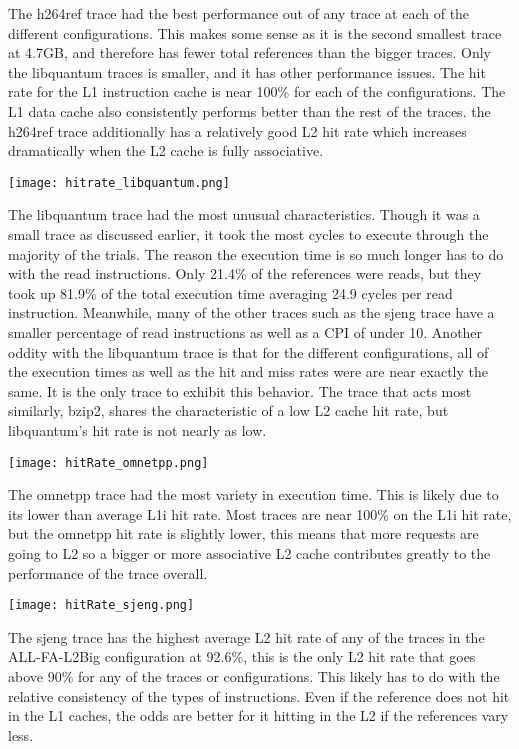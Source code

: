 \documentclass[cacheSimReport.tex]{subfiles}
\begin{document}
The h264ref trace had the best performance out of any trace at each of the different configurations. This makes some sense as it is the second smallest trace at 4.7GB, and therefore has fewer total references than the bigger traces. Only the libquantum traces is smaller, and it has other performance issues. The hit rate for the L1 instruction cache is near 100\% for each of the configurations. The L1 data cache also consistently performs better than the rest of the traces. the h264ref trace additionally has a relatively good L2 hit rate which increases dramatically when the L2 cache is fully associative.

\hspace{-.9cm}\texttt{[image: hitrate\_libquantum.png]}

The libquantum trace had the most unusual characteristics. Though it was a small trace as discussed earlier, it took the most cycles to execute through the majority of the trials. The reason the execution time is so much longer has to do with the read instructions. Only 21.4\% of the references were reads, but they took up 81.9\% of the total execution time averaging 24.9 cycles per read instruction. Meanwhile, many of the other traces such as the sjeng trace have a smaller percentage of read instructions as well as a CPI of under 10. Another oddity with the libquantum trace is that for the different configurations, all of the execution times as well as the hit and miss rates were are near exactly the same. It is the only trace to exhibit this behavior. The trace that acts most similarly, bzip2, shares the characteristic of a low L2 cache hit rate, but libquantum's hit rate is not nearly as low. 

\hspace{-.9cm}\texttt{[image: hitRate\_omnetpp.png]}

The omnetpp trace had the most variety in execution time. This is likely due to its lower than average L1i hit rate. Most traces are near 100\% on the L1i hit rate, but the omnetpp hit rate is slightly lower, this means that more requests are going to L2 so a bigger or more associative L2 cache contributes greatly to the performance of the trace overall.

\hspace{-.9cm}\texttt{[image: hitRate\_sjeng.png]}
 
The sjeng trace has the highest average L2 hit rate of any of the traces in the ALL-FA-L2Big configuration at 92.6\%, this is the only L2 hit rate that goes above 90\% for any of the traces or configurations. This likely has to do with the relative consistency of the types of instructions. Even if the reference does not hit in the L1 caches, the odds are better for it hitting in the L2 if the references vary less.
\end{document}
